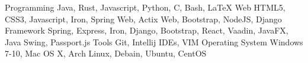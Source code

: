 \begin{cvskills}
	\cvskill
	  {Programming}
	  {Java, Rust, Javascript, Python, C, Bash, LaTeX}
	\cvskill
	  {Web}
	  {HTML5, CSS3, Javascript, Iron, Spring Web, Actix Web, Bootstrap, NodeJS, Django}
	\cvskill
	  {Framework}
	  {Spring, Express, Iron, Django, Bootstrap, React, Vaadin, JavaFX, Java Swing, Passport.js}
	\cvskill
	  {Tools}
	  {Git, Intellij IDEs, VIM}
	\cvskill
	  {Operating System}
	  {Windows 7-10, Mac OS X, Arch Linux, Debain, Ubuntu, CentOS}
\end{cvskills}
